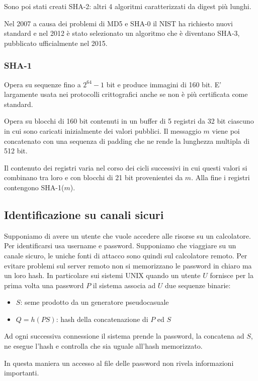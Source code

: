 Sono poi stati creati SHA-2: altri 4 algoritmi caratterizzati da digest più lunghi.

Nel 2007 a causa dei problemi di MD5 e SHA-0 il NIST ha richiesto nuovi standard e nel 2012 è stato selezionato un algoritmo che è diventano SHA-3, pubblicato ufficialmente nel 2015.

\subsubsection{SHA-1}
Opera su sequenze fino a $2^{64}-1$ bit e produce immagini di 160 bit.
E' largamente usata nei protocolli crittografici anche se non è più certificata come standard.

Opera su blocchi di 160 bit contenuti in un buffer di 5 registri da 32 bit ciascuno in cui sono caricati inizialmente dei valori pubblici.
Il messaggio $m$ viene poi concatenato con una sequenza di padding che ne rende la lunghezza multipla di 512 bit.

Il contenuto dei registri varia nel corso dei cicli successivi in cui questi valori si combinano tra loro e con blocchi di 21 bit provenientei da $m$.
Alla fine i registri contengono SHA-1($m$).

\subsection{Identificazione su canali sicuri}
Supponiamo di avere un utente che vuole accedere alle risorse su un calcolatore.
Per identificarsi usa username e password.
Supponiamo che viaggiare su un canale sicuro, le uniche fonti di attacco sono quindi sul calcolatore remoto.
Per evitare problemi sul server remoto non si memorizzano le password in chiaro ma un loro hash.
In particolare sui sistemi UNIX quando un utente $U$ fornisce per la prima volta una password $P$ il sistema associa ad $U$ due sequenze binarie:
\begin{itemize}
    \item $S$: seme prodotto da un generatore pseudocasuale
    \item $Q = h(PS)$: hash della concatenazione di $P$ ed $S$
\end{itemize}

Ad ogni successiva connessione il sistema prende la password, la concatena ad $S$, ne esegue l'hash e controlla che sia uguale all'hash memorizzato.

In questa maniera un accesso al file delle password non rivela informazioni importanti.

